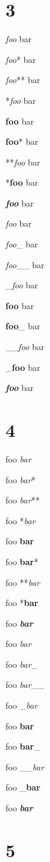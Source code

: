 \part{3}
\label{3}

\emph{foo} bar

\emph{foo}* bar

\emph{foo}** bar

*\emph{foo} bar

\textbf{foo} bar

\textbf{foo}* bar

**\emph{foo} bar

*\textbf{foo} bar

\textbf{\emph{foo}} bar

\emph{foo} bar

\emph{foo}\_ bar

\emph{foo}\_\_ bar

\_\emph{foo} bar

\textbf{foo} bar

\textbf{foo}\_ bar

\_\_\emph{foo} bar

\_\textbf{foo} bar

\textbf{\emph{foo}} bar

\part{4}
\label{4}

foo \emph{bar}

foo \emph{bar}*

foo \emph{bar}**

foo *\emph{bar}

foo \textbf{bar}

foo \textbf{bar}*

foo **\emph{bar}

foo *\textbf{bar}

foo \textbf{\emph{bar}}

foo \emph{bar}

foo \emph{bar}\_

foo \emph{bar}\_\_

foo \_\emph{bar}

foo \textbf{bar}

foo \textbf{bar}\_

foo \_\_\emph{bar}

foo \_\textbf{bar}

foo \textbf{\emph{bar}}

\part{5}
\label{5}

